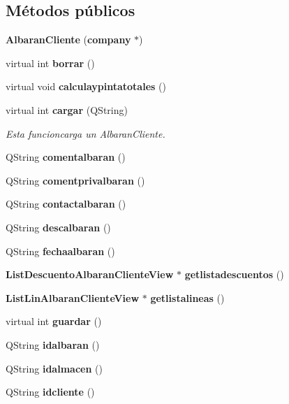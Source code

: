 \subsection*{M\'{e}todos p\'{u}blicos}
\begin{CompactItemize}
\item 
{\bf Albaran\-Cliente} ({\bf company} $\ast$)\label{classAlbaranCliente_a0}

\item 
virtual int {\bf borrar} ()\label{classAlbaranCliente_a1}

\item 
virtual void {\bf calculaypintatotales} ()
\item 
virtual int {\bf cargar} (QString)\label{classAlbaranCliente_a3}

\begin{CompactList}\small\item\em Esta funcioncarga un Albaran\-Cliente. \item\end{CompactList}\item 
QString {\bf comentalbaran} ()\label{classAlbaranCliente_a4}

\item 
QString {\bf comentprivalbaran} ()\label{classAlbaranCliente_a5}

\item 
QString {\bf contactalbaran} ()\label{classAlbaranCliente_a6}

\item 
QString {\bf descalbaran} ()\label{classAlbaranCliente_a7}

\item 
QString {\bf fechaalbaran} ()\label{classAlbaranCliente_a8}

\item 
{\bf List\-Descuento\-Albaran\-Cliente\-View} $\ast$ {\bf getlistadescuentos} ()\label{classAlbaranCliente_a9}

\item 
{\bf List\-Lin\-Albaran\-Cliente\-View} $\ast$ {\bf getlistalineas} ()\label{classAlbaranCliente_a10}

\item 
virtual int {\bf guardar} ()
\item 
QString {\bf idalbaran} ()\label{classAlbaranCliente_a12}

\item 
QString {\bf idalmacen} ()\label{classAlbaranCliente_a13}

\item 
QString {\bf idcliente} ()\label{classAlbaranCliente_a14}


\end{CompactItemize}
